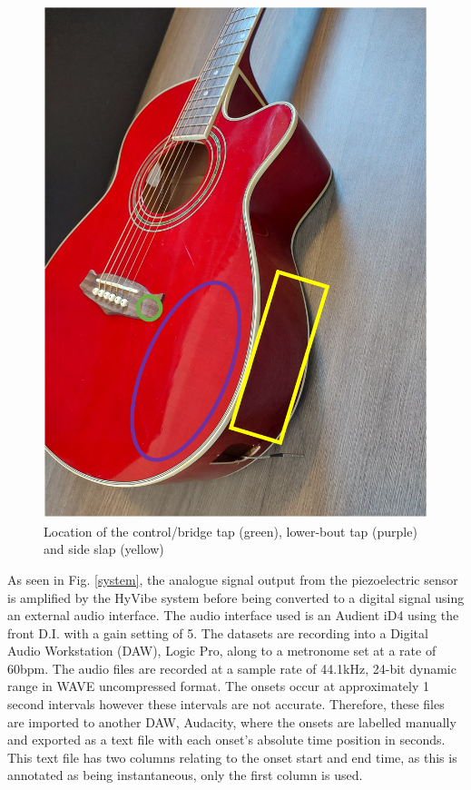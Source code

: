 \documentclass[conference]{IEEEtran}
\begin{document}
\begin{figure}[htbp]
    \centerline{\includegraphics[scale=0.4]{tanglewood-taps.png}}
    \caption{Location of the control/bridge tap (green), lower-bout tap (purple) and side slap (yellow)}
    \label{tanglewood-taps}
    \end{figure}


As seen in Fig. \ref{system}, the analogue signal output from the piezoelectric sensor is amplified by the HyVibe system before being converted to a digital signal using an external audio interface. The audio interface used is an Audient iD4 using the front D.I. with a gain setting of 5. The datasets are recording into a Digital Audio Workstation (DAW), Logic Pro, along to
a metronome set at a rate of 60bpm. The audio files are recorded at a sample rate of 44.1kHz, 24-bit dynamic range in WAVE uncompressed format. The onsets occur at approximately 1 second intervals however these intervals are not accurate. Therefore, these files are imported 
to another DAW, Audacity, where the onsets are labelled manually and exported as a text file with each onset's absolute time position in seconds. This text file has two columns relating to the onset start and end time, as this is annotated as being instantaneous, only the first column is used.
\end{document}
